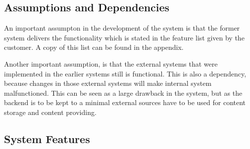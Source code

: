 \subsection{Assumptions and Dependencies}

An important assumpton in the development of the system is that the former system delivers the functionality which is stated in the feature list given by the customer. A copy of this list can be found in the appendix.

\noindent

Another important assumption, is that the external systems that were implemented in the earlier systems still is functional. This is also a dependency, because changes in those external systems will make internal system malfunctioned. This can be seen as a large drawback in the system, but as the backend is to be kept to a minimal external sources have to be used for content storage and content providing.

\subsection{System Features}

\clearpage

